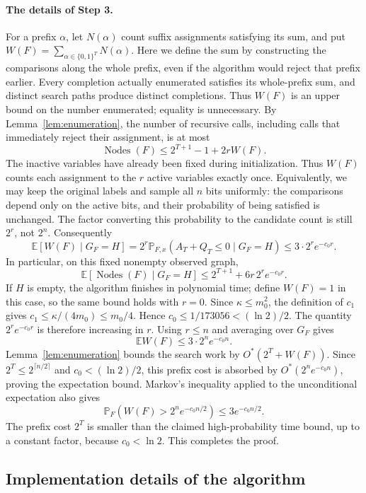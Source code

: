 \documentclass[11pt,a4paper]{article}
\theoremstyle{definition}
\theoremstyle{remark}
\newcommand{\Ostar}{O^{*}}
\newcommand{\E}{\mathbb E}
\newcommand{\Prb}{\mathbb P}
\newcommand{\bits}{\{0,1\}}
\begin{document}
\paragraph{The details of Step 3.}
For a prefix $\alpha$, let $N(\alpha)$ count suffix assignments satisfying
its sum, and put $W(F)=\sum_{\alpha\in\bits^T}N(\alpha)$.
Here we define the sum by constructing the comparisons along the whole
prefix, even if the algorithm would reject that prefix earlier. Every
completion actually enumerated satisfies its whole-prefix sum, and distinct
search paths produce distinct completions. Thus $W(F)$ is an upper bound
on the number enumerated; equality is unnecessary. By
Lemma~\ref{lem:enumeration}, the number of recursive calls, including
calls that immediately reject their assignment, is at most
\[
 \operatorname{Nodes}(F)\le 2^{T+1}-1+2rW(F).
\]
The inactive variables have already been fixed during initialization.
Thus $W(F)$ counts each assignment to the $r$ active variables exactly
once. Equivalently, we may keep the original labels and sample all $n$
bits uniformly: the comparisons depend only on the active bits, and
their probability of being satisfied is unchanged. The factor converting
this probability to the candidate count is still $2^r$, not $2^n$.
Consequently
\[
 \E[W(F)\mid G_F=H]
 =2^r\Prb_{F,x}(A_T+Q_T\le0\mid G_F=H)
 \le3\cdot2^r e^{-c_0r}.
\]
In particular, on this fixed nonempty observed graph,
\[
 \E[\operatorname{Nodes}(F)\mid G_F=H]
 \le 2^{T+1}+6r\,2^r e^{-c_0r}.
\]
If $H$ is empty, the algorithm finishes in polynomial time; define
$W(F)=1$ in this case, so the same bound holds with $r=0$.
Since $\kappa\le m_0^2$, the definition of $c_1$ gives
$c_1\le\kappa/(4m_0)\le m_0/4$. Hence
$c_0\le1/173056<(\ln2)/2$.
The quantity $2^r e^{-c_0r}$ is therefore increasing in $r$.
Using $r\le n$ and averaging over $G_F$ gives
\[
 \E W(F)\le3\cdot2^n e^{-c_0n}.
\]
Lemma~\ref{lem:enumeration} bounds the search work by
$\Ostar(2^T+W(F))$. Since $2^T\le2^{\lceil n/2\rceil}$ and $c_0<(\ln2)/2$, this prefix
cost is absorbed by $\Ostar(2^ne^{-c_0n})$, proving the expectation bound.
Markov's inequality applied to the unconditional expectation also gives
\[
 \Prb_F\left(W(F)>2^n e^{-c_0n/2}\right)
 \le3e^{-c_0n/2}.
\]
The prefix cost $2^T$ is smaller than the claimed high-probability time
bound, up to a constant factor, because $c_0<\ln2$.
This completes the proof.

\subsection{Implementation details of the algorithm}\label{app:random_implementation}
\end{document}
